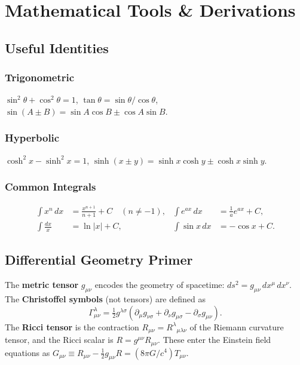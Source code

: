
\chapter{Mathematical Tools \& Derivations}

\section{Useful Identities}

\subsection*{Trigonometric}
$\sin^2\theta + \cos^2\theta = 1$,\quad
$\tan\theta = \sin\theta/\cos\theta$,\quad
$\sin(A\pm B) = \sin A\cos B \pm \cos A\sin B$.

\subsection*{Hyperbolic}
$\cosh^2 x - \sinh^2 x = 1$,\quad
$\sinh(x\pm y) = \sinh x\cosh y \pm \cosh x\sinh y$.

\subsection*{Common Integrals}
\begin{align*}
  \int x^n\,dx &= \tfrac{x^{n+1}}{n+1} + C \quad (n\neq-1), &
  \int e^{ax}\,dx &= \tfrac{1}{a}e^{ax}+C,\\
  \int \frac{dx}{x} &= \ln|x|+C, &
  \int \sin x\,dx &= -\cos x + C.
\end{align*}

\section{Differential Geometry Primer}

The \textbf{metric tensor} $g_{\mu\nu}$ encodes the geometry of spacetime:
$ds^2 = g_{\mu\nu}\,dx^\mu\,dx^\nu$.
The \textbf{Christoffel symbols} (not tensors) are defined as
\begin{equation}
  \Gamma^\lambda_{\mu\nu} = \tfrac{1}{2}g^{\lambda\sigma}
    (\partial_\mu g_{\nu\sigma} + \partial_\nu g_{\mu\sigma} - \partial_\sigma g_{\mu\nu}).
\end{equation}
The \textbf{Ricci tensor} is the contraction $R_{\mu\nu} = R^\lambda{}_{\mu\lambda\nu}$
of the Riemann curvature tensor, and the Ricci scalar is $R = g^{\mu\nu}R_{\mu\nu}$.
These enter the Einstein field equations as
$G_{\mu\nu} \equiv R_{\mu\nu} - \tfrac{1}{2}g_{\mu\nu}R = (8\pi G/c^4)T_{\mu\nu}$.

